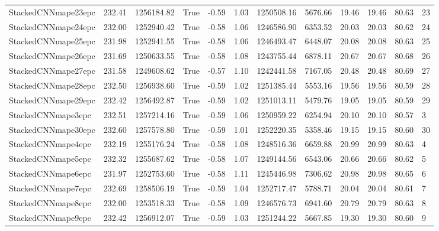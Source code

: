 \begin{tabular}{lrrlrrrrrrrl}
StackedCNNmape23epc & 232.41 & 1256184.82 & True & -0.59 & 1.03 & 1250508.16 & 5676.66 & 19.46 & 19.46 & 80.63 & 23 \\
StackedCNNmape24epc & 232.00 & 1252940.42 & True & -0.58 & 1.06 & 1246586.90 & 6353.52 & 20.03 & 20.03 & 80.62 & 24 \\
StackedCNNmape25epc & 231.98 & 1252941.55 & True & -0.58 & 1.06 & 1246493.47 & 6448.07 & 20.08 & 20.08 & 80.63 & 25 \\
StackedCNNmape26epc & 231.69 & 1250633.55 & True & -0.58 & 1.08 & 1243755.44 & 6878.11 & 20.67 & 20.67 & 80.68 & 26 \\
StackedCNNmape27epc & 231.58 & 1249608.62 & True & -0.57 & 1.10 & 1242441.58 & 7167.05 & 20.48 & 20.48 & 80.69 & 27 \\
StackedCNNmape28epc & 232.50 & 1256938.60 & True & -0.59 & 1.02 & 1251385.44 & 5553.16 & 19.56 & 19.56 & 80.59 & 28 \\
StackedCNNmape29epc & 232.42 & 1256492.87 & True & -0.59 & 1.02 & 1251013.11 & 5479.76 & 19.05 & 19.05 & 80.59 & 29 \\
StackedCNNmape3epc & 232.51 & 1257214.16 & True & -0.59 & 1.06 & 1250959.22 & 6254.94 & 20.10 & 20.10 & 80.57 & 3 \\
StackedCNNmape30epc & 232.60 & 1257578.80 & True & -0.59 & 1.01 & 1252220.35 & 5358.46 & 19.15 & 19.15 & 80.60 & 30 \\
StackedCNNmape4epc & 232.19 & 1255176.24 & True & -0.58 & 1.08 & 1248516.36 & 6659.88 & 20.99 & 20.99 & 80.63 & 4 \\
StackedCNNmape5epc & 232.32 & 1255687.62 & True & -0.58 & 1.07 & 1249144.56 & 6543.06 & 20.66 & 20.66 & 80.62 & 5 \\
StackedCNNmape6epc & 231.97 & 1252753.60 & True & -0.58 & 1.11 & 1245446.98 & 7306.62 & 20.98 & 20.98 & 80.65 & 6 \\
StackedCNNmape7epc & 232.69 & 1258506.19 & True & -0.59 & 1.04 & 1252717.47 & 5788.71 & 20.04 & 20.04 & 80.61 & 7 \\
StackedCNNmape8epc & 232.00 & 1253518.33 & True & -0.58 & 1.09 & 1246576.73 & 6941.60 & 20.79 & 20.79 & 80.63 & 8 \\
StackedCNNmape9epc & 232.42 & 1256912.07 & True & -0.59 & 1.03 & 1251244.22 & 5667.85 & 19.30 & 19.30 & 80.60 & 9 \\
\bottomrule
\end{tabular}
